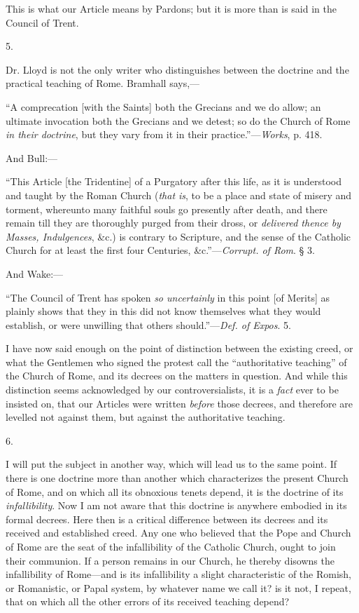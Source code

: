 This is what our Article means by Pardons; but it
is more than is said in the Council of Trent.

5.

Dr. Lloyd is not the only writer who
distinguishes between the doctrine and the practical teaching of Rome.
Bramhall says,—

``A
comprecation [with the Saints] both the Grecians and we do allow; an
ultimate invocation both the Grecians and we detest; so do the Church
of Rome \emph{in their doctrine}, but they vary from it in their
practice.''—\emph{Works}, p. 418.

And Bull:—

``This
Article [the Tridentine] of a Purgatory after this life, as it is
understood and taught by the Roman Church (\emph{that is}, to be a
place and state of misery and torment, whereunto many faithful souls
go presently after death, and there remain till they are thoroughly
purged from their dross, or \emph{delivered thence by Masses, Indulgences},
\&c.) is contrary to Scripture, and the sense of the Catholic
Church for at least the first four Centuries, \&c.''—\emph{Corrupt.
of Rom}. § 3.

And Wake:—

``The
Council of Trent has spoken \emph{so uncertainly} in this point [of
Merits] as plainly shows that they in this did not know themselves
what they would establish, or
were unwilling that others should.''—\emph{Def. of Expos}. 5.

I have now said enough on the point of
distinction between the existing creed, or what the Gentlemen who
signed the protest call the ``authoritative teaching'' of the Church of
Rome, and its decrees on the matters in question. And while this
distinction seems acknowledged by our controversialists, it is a \emph{fact}
ever to be insisted on, that our Articles were written \emph{before}
those decrees, and therefore are levelled not against them, but
against the authoritative teaching.

6.

I will put the subject in another way, which will
lead us to the same point. If there is one doctrine more than another
which characterizes the present Church of Rome, and on which all its
obnoxious tenets depend, it is the doctrine of its \emph{infallibility}.
Now I am not aware that this doctrine is anywhere embodied in its
formal decrees. Here then is a critical difference between its decrees
and its received and established creed. Any one who believed that the
Pope and Church of Rome are the seat of the infallibility of the
Catholic Church, ought to join their communion. If a person remains in
our Church, he thereby disowns the infallibility of Rome—and is its
infallibility a slight characteristic of the Romish, or Romanistic, or
Papal system, by whatever name we call it? is it not, I repeat, that
on which all the other errors of its received teaching depend?

